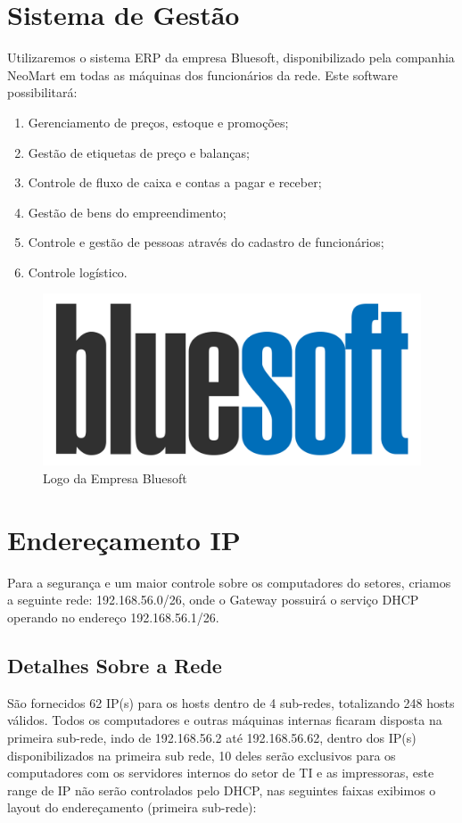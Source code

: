 \documentclass[12pt]{article}
\begin{document}
\section{Sistema de Gestão}
Utilizaremos o sistema ERP da empresa Bluesoft, disponibilizado pela companhia NeoMart em todas as máquinas dos funcionários da rede. Este software possibilitará:

\begin{enumerate}
    \item Gerenciamento de preços, estoque e promoções;
    \item Gestão de etiquetas de preço e balanças;
    \item Controle de fluxo de caixa e contas a pagar e receber;
    \item Gestão de bens do empreendimento;
    \item Controle e gestão de pessoas através do cadastro de funcionários;
    \item Controle logístico.
\end{enumerate}

\begin{figure}[ht]
\centering
\includegraphics[height=0.2\textwidth]{Logo-bluesoft.png}
\caption{Logo da Empresa Bluesoft}
\label{fig:adds-pastas}
\end{figure}

\section{Endereçamento IP}
Para a segurança e um maior controle sobre os computadores do setores, criamos a seguinte rede: 192.168.56.0/26, onde o Gateway possuirá o serviço DHCP operando no endereço 192.168.56.1/26.

\subsection{Detalhes Sobre a Rede}
São fornecidos 62 IP(s) para os hosts dentro de 4 sub-redes, totalizando 248 hosts válidos. Todos os computadores e outras máquinas internas ficaram disposta na primeira sub-rede, indo de 192.168.56.2 até 192.168.56.62, dentro dos IP(s) disponibilizados na primeira sub rede, 10 deles serão exclusivos para os computadores com os servidores internos do setor de TI e as impressoras, este range de IP não serão controlados pelo DHCP, nas seguintes faixas exibimos o layout do endereçamento (primeira sub-rede):
\end{document}
